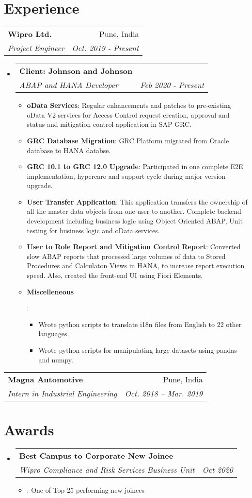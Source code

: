 \documentclass[letterpaper,11pt]{article}
\makeatletter
\newcommand{\resumeItem}[2]{
  \item\small{
    \textbf{#1}{: #2 \vspace{-2pt}}
  }
}
\newcommand{\resumeCompany}[4]{
    \begin{tabular*}{0.99\textwidth}[t]{l@{\extracolsep{\fill}}r}
      \textbf{#1} & #2 \\
      \textit{\small#3} & \textit{\small #4} \\
    \end{tabular*}\vspace{-5pt}
}
\newcommand{\resumeSubheading}[4]{
  \vspace{-1pt}\item
    \begin{tabular*}{0.97\textwidth}[t]{l@{\extracolsep{\fill}}r}
      \textbf{#1} & #2 \\
      \textit{\small#3} & \textit{\small #4} \\
    \end{tabular*}\vspace{-5pt}
}
\newcommand{\resumeSubSubheading}[2]{
    \begin{tabular*}{0.97\textwidth}{l@{\extracolsep{\fill}}r}
      \textit{\small#1} & \textit{\small #2} \\
    \end{tabular*}\vspace{-5pt}
}
\newcommand{\resumeSubHeadingListStart}{\begin{itemize}[leftmargin=*]}
\newcommand{\resumeSubHeadingListEnd}{\end{itemize}}
\newcommand{\resumeItemListStart}{\begin{itemize}}
\newcommand{\resumeItemListEnd}{\end{itemize}\vspace{-5pt}}
\makeatother
\begin{document}
\section{Experience}
	\resumeCompany
      {Wipro Ltd.}{Pune, India}
      {Project Engineer}{Oct. 2019 - Present}
		\resumeSubHeadingListStart
		\resumeSubheading
		  {Client: Johnson and Johnson}{}
		  {ABAP and HANA Developer}{Feb 2020 - Present}
			\resumeItemListStart
				\resumeItem{oData Services}
				  {Regular enhancements and patches to pre-existing oData V2 services for Access Control request creation, approval and status and mitigation control application in SAP GRC.}
				\resumeItem{GRC Database Migration}
				  {GRC Platform migrated from Oracle database to HANA databse.}
				\resumeItem{GRC 10.1 to GRC 12.0 Upgrade}
				  {Participated in one complete E2E implementation, hypercare and support cycle during major version upgrade.}
				\resumeItem{User Transfer Application}
				  {This application transfers the ownership of all the master data objects from one user to another. Complete backend development including business logic using Object Oriented ABAP, Unit testing for business logic and oData services.}
				\resumeItem{User to Role Report and Mitigation Control Report} 
				  {Converted slow ABAP reports that processed large volumes of data to Stored Procedures and Calculaton Views in HANA, to increase report execution speed. Also, created the front-end UI using Fiori Elements.}
				\resumeItem{Miscelleneous}
				  {
					\begin{itemize}
						\item Wrote python scripts to translate i18n files from English to 22 other languages.
						\item Wrote python scripts for manipulating large datasets using pandas and numpy.
					\end{itemize}
				  }
			\resumeItemListEnd
		\resumeSubHeadingListEnd
	\resumeCompany
		{Magna Automotive}{Pune, India}
		{Intern in Industrial Engineering}{Oct. 2018 -- Mar. 2019}
      


\section{Awards}
  \resumeSubHeadingListStart
	  	\resumeSubheading
	  	  {Best Campus to Corporate New Joinee}{}
		  {Wipro Compliance and Risk Services Business Unit}{Oct 2020}
		  \resumeItemListStart
			  \resumeItem{}{One of Top 25 performing new joinees}
		  \resumeItemListEnd
  \resumeSubHeadingListEnd
\end{document}
